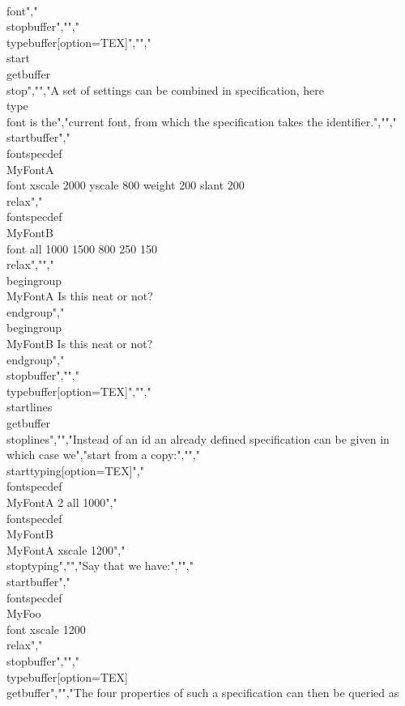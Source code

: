 \\font","\\stopbuffer","","\\typebuffer[option=TEX]","","\\start \\getbuffer \\stop","","A set of settings can be combined in specification, here \\type {\\font} is the","current font, from which the specification takes the identifier.","","\\startbuffer","\\fontspecdef \\MyFontA \\font xscale 2000 yscale 800 weight 200 slant 200 \\relax","\\fontspecdef \\MyFontB \\font all 1000 1500 800 250 150 \\relax","","\\begingroup \\MyFontA Is this neat or not? \\endgroup","\\begingroup \\MyFontB Is this neat or not? \\endgroup","\\stopbuffer","","\\typebuffer[option=TEX]","","\\startlines \\getbuffer \\stoplines","","Instead of an id an already defined specification can be given in which case we","start from a copy:","","\\starttyping[option=TEX]","\\fontspecdef \\MyFontA 2 all 1000","\\fontspecdef \\MyFontB \\MyFontA xscale 1200","\\stoptyping","","Say that we have:","","\\startbuffer","\\fontspecdef\\MyFoo\\font xscale 1200 \\relax","\\stopbuffer","","\\typebuffer[option=TEX] \\getbuffer","","The four properties of such a specification can then be queried as 
